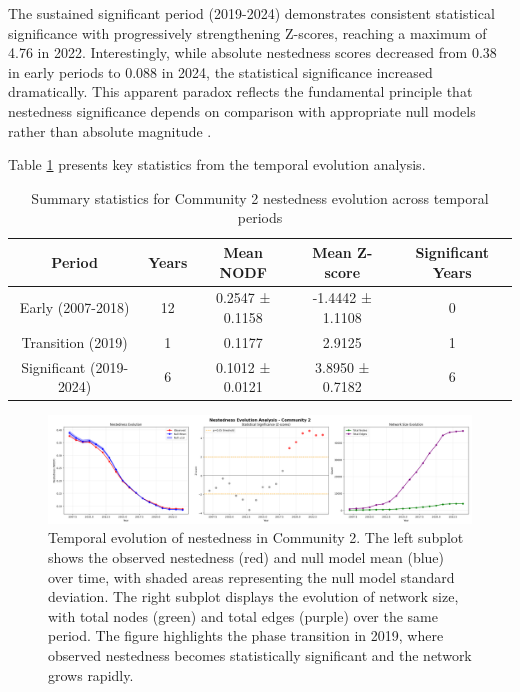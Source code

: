 The sustained significant period (2019-2024) demonstrates consistent statistical significance with progressively strengthening Z-scores, reaching a maximum of 4.76 in 2022. Interestingly, while absolute nestedness scores decreased from 0.38 in early periods to 0.088 in 2024, the statistical significance increased dramatically. This apparent paradox reflects the fundamental principle that nestedness significance depends on comparison with appropriate null models rather than absolute magnitude \cite{Mariani2019}.

Table \ref{tab:nestedness_evolution_summary} presents key statistics from the temporal evolution analysis.

\begin{table}[htbp]
\hspace*{-1cm}\centering
\begin{tabular}{|c|c|c|c|c|}
\hline
\textbf{Period} & \textbf{Years} & \textbf{Mean NODF} & \textbf{Mean Z-score} & \textbf{Significant Years} \\
\hline
Early (2007-2018) & 12 & 0.2547 ± 0.1158 & -1.4442 ± 1.1108 & 0 \\
Transition (2019) & 1 & 0.1177 & 2.9125 & 1 \\
Significant (2019-2024) & 6 & 0.1012 ± 0.0121 & 3.8950 ± 0.7182 & 6 \\
\hline
\end{tabular}
\caption{Summary statistics for Community 2 nestedness evolution across temporal periods}
\label{tab:nestedness_evolution_summary}
\end{table}

\begin{figure}[htbp]
\hspace*{-1cm}\centering
\includegraphics[width=1.2\textwidth]{./assets/observed-vs-null-model.png}
\caption{Temporal evolution of nestedness in Community 2. The left subplot shows the observed nestedness (red) and null model mean (blue) over time, with shaded areas representing the null model standard deviation. The right subplot displays the evolution of network size, with total nodes (green) and total edges (purple) over the same period. The figure highlights the phase transition in 2019, where observed nestedness becomes statistically significant and the network grows rapidly.}
\label{fig:observed_vs_null_model}
\end{figure}

